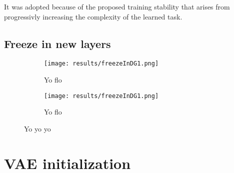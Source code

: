 It was adopted because of the proposed training stability that arises from progressivly increasing the complexity of the learned task. 

\subsection{Freeze in new layers}

\begin{figure}[t]
    \centering
    \begin{subfigure}[b]{0.45\textwidth}
        \texttt{[image: results/freezeInDG1.png]}
        \caption{Yo flo}
        \label{fig:freezeInDG1}
    \end{subfigure}
    \begin{subfigure}[b]{0.45\textwidth}
        \texttt{[image: results/freezeInDG1.png]}
        \caption{Yo flo}
        \label{fig:freezeInDG2}
    \end{subfigure}
    \caption{Yo yo yo}
    \label{fig:fadeVsFreeze}
\end{figure}



\section{VAE initialization}



